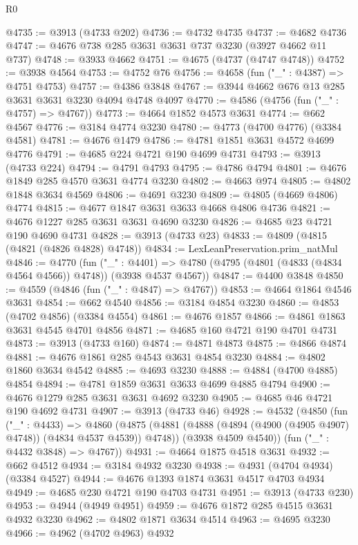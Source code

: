 \begin{lexlean}{R0}
\begin{coremodule}
@4735 := @3913 (@4733 @202)
@4736 := @4732 @4735
@4737 := @4682 @4736
@4747 := @4676 @738 @285 @3631 @3631 @737 @3230 (@3927 @4662 @11 @737)
@4748 := @3933 @4662
@4751 := @4675 (@4737 (@4747 @4748))
@4752 := @3938 @4564
@4753 := @4752 @76
@4756 := @4658 (fun ("_" : @4387) => @4751 @4753)
@4757 := @4386 @3848
@4767 := @3944 @4662 @676 @13 @285 @3631 @3631 @3230 @4094 @4748 @4097
@4770 := @4586 (@4756 (fun ("_" : @4757) => @4767))
@4773 := @4664 @1852 @4573 @3631
@4774 := @662 @4567
@4776 := @3184 @4774 @3230
@4780 := @4773 (@4700 @4776) (@3384 @4581)
@4781 := @4676 @1479
@4786 := @4781 @1851 @3631 @4572 @4699 @4776
@4791 := @4685 @224 @4721 @190 @4699 @4731
@4793 := @3913 (@4733 @224)
@4794 := @4791 @4793
@4795 := @4786 @4794
@4801 := @4676 @1849 @285 @4570 @3631 @4774 @3230
@4802 := @4663 @974
@4805 := @4802 @1848 @3634 @4569
@4806 := @4691 @3230
@4809 := @4805 (@4669 @4806) @4774
@4815 := @4677 @1847 @3631 @3633 @4668 @4806 @4736
@4821 := @4676 @1227 @285 @3631 @3631 @4690 @3230
@4826 := @4685 @23 @4721 @190 @4690 @4731
@4828 := @3913 (@4733 @23)
@4833 := @4809 (@4815 (@4821 (@4826 @4828) @4748))
@4834 := LexLeanPreservation.prim_natMul
@4846 := @4770
    (fun ("_" : @4401) =>
    @4780 (@4795 (@4801 (@4833 (@4834 @4564 @4566)) @4748)) (@3938 @4537 @4567))
@4847 := @4400 @3848
@4850 := @4559 (@4846 (fun ("_" : @4847) => @4767))
@4853 := @4664 @1864 @4546 @3631
@4854 := @662 @4540
@4856 := @3184 @4854 @3230
@4860 := @4853 (@4702 @4856) (@3384 @4554)
@4861 := @4676 @1857
@4866 := @4861 @1863 @3631 @4545 @4701 @4856
@4871 := @4685 @160 @4721 @190 @4701 @4731
@4873 := @3913 (@4733 @160)
@4874 := @4871 @4873
@4875 := @4866 @4874
@4881 := @4676 @1861 @285 @4543 @3631 @4854 @3230
@4884 := @4802 @1860 @3634 @4542
@4885 := @4693 @3230
@4888 := @4884 (@4700 @4885) @4854
@4894 := @4781 @1859 @3631 @3633 @4699 @4885 @4794
@4900 := @4676 @1279 @285 @3631 @3631 @4692 @3230
@4905 := @4685 @46 @4721 @190 @4692 @4731
@4907 := @3913 (@4733 @46)
@4928 := @4532
    (@4850
      (fun ("_" : @4433) =>
      @4860
        (@4875 (@4881 (@4888 (@4894 (@4900 (@4905 @4907) @4748)) (@4834 @4537 @4539)) @4748))
        (@3938 @4509 @4540))
      (fun ("_" : @4432 @3848) => @4767))
@4931 := @4664 @1875 @4518 @3631
@4932 := @662 @4512
@4934 := @3184 @4932 @3230
@4938 := @4931 (@4704 @4934) (@3384 @4527)
@4944 := @4676 @1393 @1874 @3631 @4517 @4703 @4934
@4949 := @4685 @230 @4721 @190 @4703 @4731
@4951 := @3913 (@4733 @230)
@4953 := @4944 (@4949 @4951)
@4959 := @4676 @1872 @285 @4515 @3631 @4932 @3230
@4962 := @4802 @1871 @3634 @4514
@4963 := @4695 @3230
@4966 := @4962 (@4702 @4963) @4932

\end{coremodule}
\end{lexlean}
